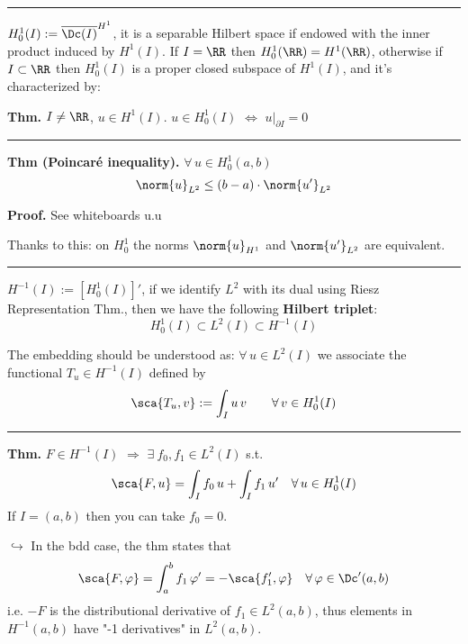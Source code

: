\rule{0.31\textwidth}{0.2pt}
\smallskip

$H^1_0(I):=\overline{\Dc(I)}^{H^1}$, it is a separable Hilbert space if endowed with the inner product induced by $H^1(I)$. If $I=\RR$ then $H^1_0(\RR)=H^1(\RR)$, otherwise if $I\subset\RR$ then $H^1_0(I)$ is a proper closed subspace of $H^1(I)$, and it's characterized by:

\smallskip

\textbf{Thm.} $I\neq\RR$, $u\in H^1(I)$. $u\in H^1_0(I)$ $\Leftrightarrow$ $u\big|_{\partial I}=0$

\rule{0.31\textwidth}{0.2pt}
\smallskip

\textbf{Thm (Poincaré inequality).} $\forall\, u\in H^1_0(a,b)$
\begin{equation*}
\norm{u}_{L^2}\leq (b-a)\cdot \norm{u'}_{L^2}
\end{equation*}

\textbf{\color{lavender(floral)}Proof.} See whiteboards u.u

\smallskip

Thanks to this: on $H^1_0$ the norms $\norm{u}_{H^1}$ and $\norm{u'}_{L^2}$ are equivalent.

\rule{0.31\textwidth}{0.2pt}
\smallskip

$H^{-1}(I):=\left[ H^1_0(I) \right]'$, if we identify $L^2$ with its dual using Riesz Representation Thm., then we have the following \textbf{Hilbert triplet}:
\begin{equation*}
H_0^1(I)\subset L^2(I) \subset H^{-1}(I)
\end{equation*}

The embedding should be understood as: $\forall\, u\in L^2(I)$ we associate the functional $T_u\in H^{-1}(I)$ defined by
\begin{equation*}
\sca{T_u,v}:=\int_I u\,v\qquad \forall\, v\in H^1_0(I)
\end{equation*}

\rule{0.31\textwidth}{0.2pt}
\smallskip

\textbf{Thm.} $F\in H^{-1}(I)$ $\Rightarrow$ $\exists\ f_0,f_1\in L^2(I)$ s.t.
\begin{equation*}
\sca{F,u}=\int_I f_0\,u+\int_I f_1\,u'\quad\forall\,u\in H^1_0(I)
\end{equation*}
If $I=(a,b)$ then you can take $f_0=0$.

\medskip

$\hookrightarrow$ In the bdd case, the thm  states that 
\begin{equation*}
\sca{F,\varphi}=\int_a^b f_1\,\varphi'=-\sca{f_1',\varphi}\quad \forall\, \varphi\in\Dc'(a,b)
\end{equation*}
i.e. $-F$ is the distributional derivative of $f_1\in L^2(a,b)$, thus elements in $H^{-1}(a,b)$ have "-1 derivatives" in $L^2(a,b)$.

